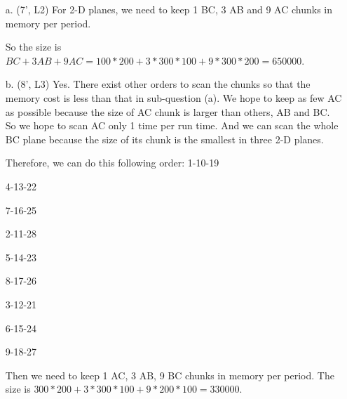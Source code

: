 \begin{itemize}
\item[a.] (7', L2) 
For 2-D planes, we need to keep 1 BC, 3 AB and 9 AC chunks in memory per period.

So the size is $BC+3AB+9AC = 100*200 + 3*300*100 + 9 * 300*200 = 650000$. 
\item [b.] (8', L3) 
Yes. There exist other orders to scan the chunks so that the memory cost is less than that in sub-question (a).
We hope to keep as few AC as possible because the size of AC chunk is larger than others, AB and BC. So we hope to scan AC only 1 time per run time. And we can scan the whole BC plane because the size of its chunk is the smallest in three 2-D planes. 

Therefore, we can do this following order:
1-10-19

4-13-22

7-16-25

2-11-28

5-14-23

8-17-26

3-12-21

6-15-24

9-18-27

Then we need to keep 1 AC, 3 AB, 9 BC chunks in memory per period.
The size is $300*200+3*300*100+9*200*100=330000$. 



\end{itemize}

